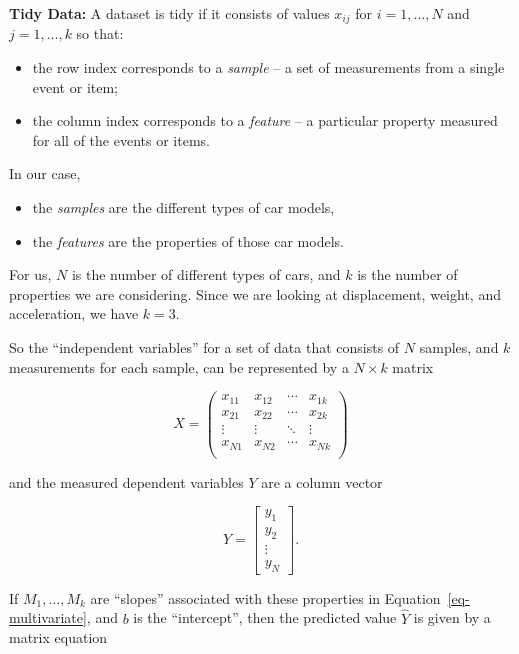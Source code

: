 \documentclass[
  11pt,
  letterpaper,
]{scrbook}
\providecommand{\tightlist}{%
  \setlength{\itemsep}{0pt}\setlength{\parskip}{0pt}}\usepackage{longtable,booktabs,array}
\theoremstyle{plain}
\theoremstyle{remark}
\begin{document}
\textbf{Tidy Data:} A dataset is tidy if it consists of values
\(x_{ij}\) for \(i=1,\ldots,N\) and \(j=1,\ldots, k\) so that:

\begin{itemize}
\tightlist
\item
  the row index corresponds to a \emph{sample} -- a set of measurements
  from a single event or item;
\item
  the column index corresponds to a \emph{feature} -- a particular
  property measured for all of the events or items.
\end{itemize}

In our case,

\begin{itemize}
\tightlist
\item
  the \emph{samples} are the different types of car models,
\item
  the \emph{features} are the properties of those car models.
\end{itemize}

For us, \(N\) is the number of different types of cars, and \(k\) is the
number of properties we are considering. Since we are looking at
displacement, weight, and acceleration, we have \(k=3\).

So the ``independent variables'' for a set of data that consists of
\(N\) samples, and \(k\) measurements for each sample, can be
represented by a \(N\times k\) matrix

\[ X = \left(\begin{matrix} x_{11} & x_{12} & \cdots & x_{1k} \\
x_{21} & x_{22} & \cdots & x_{2k} \\ \vdots & \vdots & \ddots & \vdots
\\ x_{N1} & x_{N2} & \cdots & x_{Nk} \\ \end{matrix}\right)
\]

and the measured dependent variables \(Y\) are a column vector

\[
Y =
\left[\begin{matrix} y_1 \\ y_2 \\ \vdots \\ y_N\end{matrix}\right].
\]

If \(M_1,\ldots, M_k\) are ``slopes'' associated with these properties
in Equation~\ref{eq-multivariate}, and \(b\) is the ``intercept'', then
the predicted value \(\hat{Y}\) is given by a matrix equation
\end{document}
